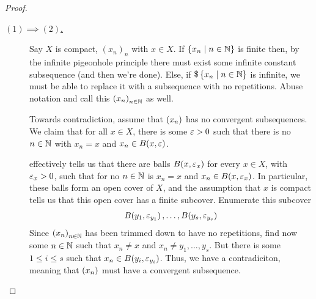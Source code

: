 \begin{proof}
    \begin{description}
        \item[\underline{$(1) \implies (2)$.}] Say $X$ is compact, $(x_n)_n$ with $x\in X$. If $\left\{ x_n \; \middle\vert \; n \in \mathbb{N} \right\}$ is finite then, by the infinite pigeonhole principle there must exist some infinite constant  subsequence (and then we're done). Else, if $\$\left\{ x_n \; \middle\vert \; n \in \mathbb{N} \right\}$ is infinite, we must be able to replace it with a subsequence with no repetitions. Abuse notation and call this $\left( x_n \right)_{n \in \mathbb{N}}$ as well.

        Towards contradiction, assume that $\left( x_n \right)$ has no convergent subsequences. We claim that for all $x \in X$, there is some $\varepsilon > 0$ such that there is no $n \in \mathbb{N}$ with $x_n = x$ and $x_n \in B\!\left( x, \varepsilon \right)$.
        
         effectively tells us that there are balls $B\!\left( x, \varepsilon_x \right)$ for every $x \in X$, with $\varepsilon_x > 0$, such that for no $n \in \mathbb{N}$ is $x_n = x$ and $x_n \in B\!\left( x, \varepsilon_x \right)$. In particular, these balls form an open cover of $X$, and the assumption that $x$ is compact tells us that this open cover has a finite subcover. Enumerate this subcover
        \begin{align*}
            B\!\left( y_1, \varepsilon_{y_1} \right), \ldots, B\!\left( y_s, \varepsilon_{y_s} \right)
        \end{align*}
        Since $\left( x_n \right)_{n \in \mathbb{N}}$ has been trimmed down to have no repetitions, find now some $n \in \mathbb{N}$ such that $x_n \neq x$ and $x_n \neq y_1, \ldots, y_s$. But there is some $1 \leq i \leq s$ such that $x_n \in B\!\left( y_i, \varepsilon_{y_i} \right)$. Thus, we have a contradiciton, meaning that $\left( x_n \right)$ must have a convergent subsequence.


\end{description}
\end{proof}

